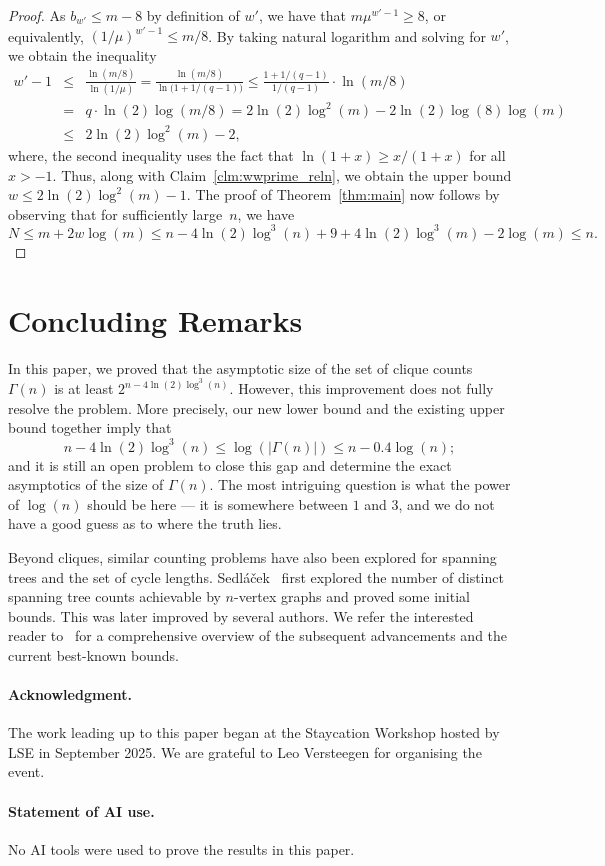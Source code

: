 \documentclass[11pt, final]{article}
\theoremstyle{definition}
\begin{document}
\begin{proof}
     As $b_{w'} \leq m - 8$ by definition of $w'$, we have that $m \mu^{w' -1} \geq 8$, or equivalently, $(1/\mu)^{w' - 1} \leq m/8$. By taking natural logarithm and solving for $w'$, we obtain the inequality 
     \begin{eqnarray*}
     w'-1 &\leq& \frac{\ln(m/8)}{\ln(1/\mu)} = \frac{\ln (m/8)}{\ln\bigl(1 + 1/(q-1)\bigr)} \leq \frac{1+1/(q-1)}{1/(q-1)}\cdot \ln( m/8)\\
     &=& q \cdot \ln(2) \log(m/8)= 2\ln(2)\log^2(m)-2\ln(2)\log(8)\log(m)\\[0.1em]
     &\leq& 2 \ln(2) \log^2 (m) - 2,    
     \end{eqnarray*}
    where, the second inequality uses the fact that $\ln(1+x) \geq x/(1+x)$ for all $x > -1$. Thus, along with Claim~\ref{clm:wwprime_reln}, we obtain the upper bound $w\leq 2\ln(2)\log^2(m)  -1 $.
    The proof of Theorem~\ref{thm:main} now follows by observing that for sufficiently large~$n$, we have $$N \leq m+2w\log(m) \leq  n-4\ln(2)\log^3(n) +9 + 4\ln(2)\log^3(m)-2\log(m) \leq n.$$\end{proof}

\section{Concluding Remarks} 

In this paper, we proved that the asymptotic size of the set of clique counts~$\Gamma(n)$ is at least $2^{n-4\ln(2)\log^3(n)}$. However, this improvement does not fully resolve the problem. More precisely, our new lower bound and the existing upper bound together imply that $$n - 4 \ln(2) \log^3(n) \leq \log(|\Gamma(n)|) \leq n - 0.4 \log(n); $$ and it is still an open problem to close this gap and determine the exact asymptotics of the size of $\Gamma(n)$. The most intriguing question is what the power of $\log(n)$ should be here --- it is somewhere between $1$ and $3$, and we do not have a good guess as to where the truth lies. 

Beyond cliques, similar counting problems have also been explored for spanning trees and the set of cycle lengths. Sedl\'{a}\v{c}ek~\cite{Spanning_tree_orig} first explored the number of distinct spanning tree counts achievable by $n$-vertex graphs and proved some initial bounds. This was later improved by several authors. We refer the interested reader to~\cite{Spanning_tree_Alon} for a comprehensive overview of the subsequent advancements and the current best-known bounds.  

\paragraph{Acknowledgment.} The work leading up to this paper began at the Staycation Workshop hosted by LSE in September 2025. We are grateful to Leo Versteegen for organising the event.

\paragraph{Statement of AI use.} No AI tools were used to prove the results in this paper.



\end{document}
